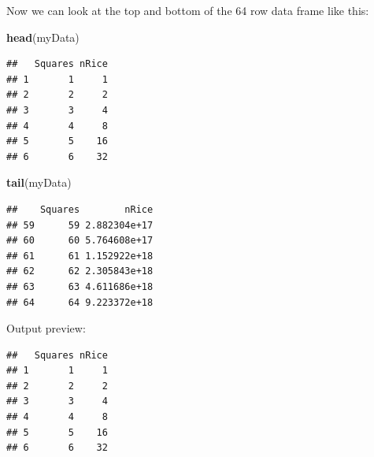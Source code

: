 \documentclass[
  a4paper]{book}
\newenvironment{Shaded}{\begin{snugshade}}{\end{snugshade}}
\newcommand{\AttributeTok}[1]{\textcolor[rgb]{0.13,0.29,0.53}{#1}}
\newcommand{\ConstantTok}[1]{\textcolor[rgb]{0.56,0.35,0.01}{#1}}
\newcommand{\ControlFlowTok}[1]{\textcolor[rgb]{0.13,0.29,0.53}{\textbf{#1}}}
\newcommand{\DecValTok}[1]{\textcolor[rgb]{0.00,0.00,0.81}{#1}}
\newcommand{\FunctionTok}[1]{\textcolor[rgb]{0.13,0.29,0.53}{\textbf{#1}}}
\newcommand{\NormalTok}[1]{#1}
\newcommand{\OtherTok}[1]{\textcolor[rgb]{0.56,0.35,0.01}{#1}}
\newcommand{\SpecialCharTok}[1]{\textcolor[rgb]{0.81,0.36,0.00}{\textbf{#1}}}
\begin{document}
\begin{Shaded}
\end{Shaded}

Now we can look at the top and bottom of the 64 row data frame like this:

\begin{Shaded}
\begin{Highlighting}[]
\FunctionTok{head}\NormalTok{(myData)}
\end{Highlighting}
\end{Shaded}

\begin{verbatim}
##   Squares nRice
## 1       1     1
## 2       2     2
## 3       3     4
## 4       4     8
## 5       5    16
## 6       6    32
\end{verbatim}

\begin{Shaded}
\begin{Highlighting}[]
\FunctionTok{tail}\NormalTok{(myData)}
\end{Highlighting}
\end{Shaded}

\begin{verbatim}
##    Squares        nRice
## 59      59 2.882304e+17
## 60      60 5.764608e+17
## 61      61 1.152922e+18
## 62      62 2.305843e+18
## 63      63 4.611686e+18
## 64      64 9.223372e+18
\end{verbatim}

Output preview:

\begin{verbatim}
##   Squares nRice
## 1       1     1
## 2       2     2
## 3       3     4
## 4       4     8
## 5       5    16
## 6       6    32
\end{verbatim}
\end{document}
